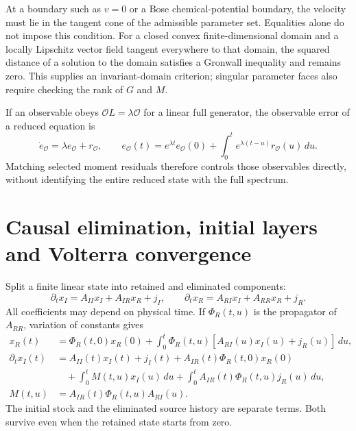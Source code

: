 At a boundary such as $v=0$ or a Bose chemical-potential boundary, the velocity must lie in the tangent cone of the admissible parameter set. Equalities alone do not impose this condition. For a closed convex finite-dimensional domain and a locally Lipschitz vector field tangent everywhere to that domain, the squared distance of a solution to the domain satisfies a Gronwall inequality and remains zero. This supplies an invariant-domain criterion; singular parameter faces also require checking the rank of $G$ and $M$.

If an observable obeys $\mathcal O L=\lambda\mathcal O$ for a linear full generator, the observable error of a reduced equation is
\begin{equation}
 \dot e_{\mathcal O}=\lambda e_{\mathcal O}+r_{\mathcal O},\qquad
 e_{\mathcal O}(t)=e^{\lambda t}e_{\mathcal O}(0)+
 \int_0^te^{\lambda(t-u)}r_{\mathcal O}(u)\,du .
 \label{v:observable_reduction}
\end{equation}
Matching selected moment residuals therefore controls those observables directly, without identifying the entire reduced state with the full spectrum.

\section{Causal elimination, initial layers and Volterra convergence}
\label{v:memory}

Split a finite linear state into retained and eliminated components:
\begin{equation}
 \partial_tx_I=A_{II}x_I+A_{IR}x_R+j_I,\qquad
 \partial_tx_R=A_{RI}x_I+A_{RR}x_R+j_R .
 \label{v:block_dynamics}
\end{equation}
All coefficients may depend on physical time. If $\Phi_R(t,u)$ is the propagator of $A_{RR}$, variation of constants gives
\begin{align}
 x_R(t)&=\Phi_R(t,0)x_R(0)+
 \int_0^t\Phi_R(t,u)[A_{RI}(u)x_I(u)+j_R(u)]\,du,\nonumber\\
 \partial_tx_I(t)&=A_{II}(t)x_I(t)+j_I(t)
 +A_{IR}(t)\Phi_R(t,0)x_R(0)\nonumber\\
 &\quad+\int_0^tM(t,u)x_I(u)\,du
 +\int_0^tA_{IR}(t)\Phi_R(t,u)j_R(u)\,du,\nonumber\\
 M(t,u)&=A_{IR}(t)\Phi_R(t,u)A_{RI}(u).
 \label{v:retarded_kernel}
\end{align}
The initial stock and the eliminated source history are separate terms. Both survive even when the retained state starts from zero.

